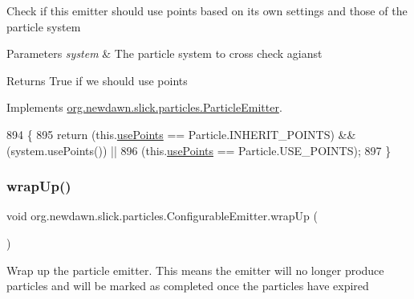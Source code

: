 Check if this emitter should use points based on it\textquotesingle{}s own settings and those of the particle system


\begin{DoxyParams}{Parameters}
{\em system} & The particle system to cross check agianst \\
\hline
\end{DoxyParams}
\begin{DoxyReturn}{Returns}
True if we should use points 
\end{DoxyReturn}


Implements \mbox{\hyperlink{interfaceorg_1_1newdawn_1_1slick_1_1particles_1_1_particle_emitter_a26ad157d83aebf2e49163ddaae6a9edd}{org.\+newdawn.\+slick.\+particles.\+Particle\+Emitter}}.


\begin{DoxyCode}
894                                                     \{
895         \textcolor{keywordflow}{return} (this.\mbox{\hyperlink{classorg_1_1newdawn_1_1slick_1_1particles_1_1_configurable_emitter_a70dbcb61667c957161a8c99b3fd563d6}{usePoints}} == Particle.INHERIT\_POINTS) && (system.usePoints()) ||
896                (this.\mbox{\hyperlink{classorg_1_1newdawn_1_1slick_1_1particles_1_1_configurable_emitter_a70dbcb61667c957161a8c99b3fd563d6}{usePoints}} == Particle.USE\_POINTS); 
897     \}
\end{DoxyCode}
\mbox{\label{classorg_1_1newdawn_1_1slick_1_1particles_1_1_configurable_emitter_a641b7c71e746caa939d3a2c16976b4e4}} 
\subsubsection{\texorpdfstring{wrap\+Up()}{wrapUp()}}
{\footnotesize\ttfamily void org.\+newdawn.\+slick.\+particles.\+Configurable\+Emitter.\+wrap\+Up (\begin{DoxyParamCaption}{ }\end{DoxyParamCaption})\hspace{0.3cm}{\ttfamily [inline]}}

Wrap up the particle emitter. This means the emitter will no longer produce particles and will be marked as completed once the particles have expired 

